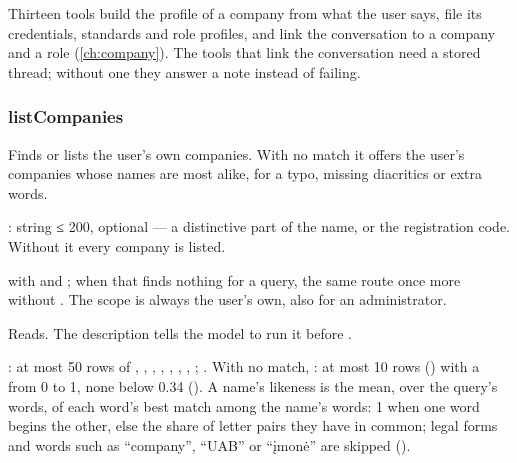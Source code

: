 Thirteen tools build the profile of a company from what the user says, file its credentials,
standards and role profiles, and link the conversation to a company and a role
(\cref{ch:company}). The tools that link the conversation need a stored thread; without one
they answer a note instead of failing.

\subsubsection{listCompanies}\label{sec:tools:listCompanies}
\begin{description}[style=multiline, leftmargin=19mm, labelwidth=17mm, labelsep=2mm,
  font=\sffamily\bfseries\footnotesize\color{ink}, itemsep=1pt, topsep=2pt, before=\raggedright]
  \item[Does] Finds or lists the user's own companies. With no match it offers the user's
    companies whose names are most alike, for a typo, missing diacritics or extra words.
  \item[Input] : string ≤ 200, optional --- a distinctive part of the name, or the
    registration code. Without it every company is listed.
  \item[Calls]  with  and ; when that finds
    nothing for a query, the same route once more without . The scope is always the
    user's own, also for an administrator.
  \item[Kind] Reads. The description tells the model to run it before .
  \item[Returns] : at most 50 rows of , ,
    , , , ,
    , ; . With no match, : at most
    10 rows () with a  from 0 to 1, none below 0.34
    (). A name's likeness is the mean, over the query's words, of each word's
    best match among the name's words: 1 when one word begins the other, else the share of
    letter pairs they have in common; legal forms and words such as \enquote{company},
    \enquote{UAB} or \enquote{įmonė} are skipped ().
\end{description}

